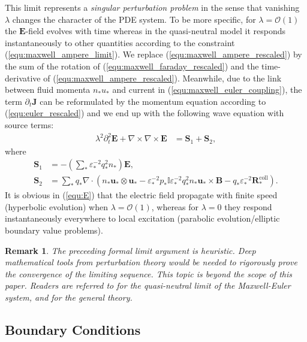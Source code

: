 \documentclass{article}
\newtheorem*{remark}{Remark}
\begin{document}
This limit represents a \emph{singular perturbation problem} in the sense that vanishing $\lambda$ changes the character of the PDE system. To be more specific, for $\lambda = \mathcal{O}(1)$ the $\mathbf{E}$-field evolves with time whereas in the quasi-neutral model it responds instantaneously to other quantities according to the constraint (\ref{equ:maxwell_ampere_limit}). We replace (\ref{equ:maxwell_ampere_rescaled}) by the sum of the rotation of (\ref{equ:maxwell_faraday_rescaled}) and the time-derivative of (\ref{equ:maxwell_ampere_rescaled}). Meanwhile, due to the link between fluid momenta $n_*u_*$ and current in (\ref{equ:maxwell_euler_coupling}), the term $\partial_t\mathbf{J}$ can be reformulated by the momentum equation according to (\ref{equ:euler_rescaled}) and we end up with the following wave equation with source terms:
\begin{align}
    \lambda^2\partial_t^2 \mathbf{E} + \nabla \times \nabla \times \mathbf{E} &= \mathbf{S}_1 + \mathbf{S}_2, \label{equ:E}
\end{align}
where
\begin{align*}
    \mathbf{S}_1 &= - \left(\sum_*\varepsilon_*^{-2}q_*^2n_*\right)\mathbf{E}, \\
    \mathbf{S}_2 &= \sum_* q_*\nabla\cdot(n_* \mathbf{u}_* \otimes \mathbf{u}_* - \varepsilon_*^{-2}p_*\mathbb{I}\varepsilon_*^{-2}q_*^2n_*\mathbf{u}_*\times\mathbf{B} - q_*\varepsilon_*^{-2}\mathbf{R}^\text{coll}_*).
\end{align*}
 It is obvious in (\ref{equ:E}) that the electric field propagate with finite speed (hyperbolic evolution) when $\lambda = \mathcal{O}(1)$, whereas for $\lambda = 0$ they respond instantaneously everywhere to local excitation (parabolic evolution/elliptic boundary value problems).

\begin{remark}
    The preceeding formal limit argument is heuristic. Deep mathematical tools from perturbation theory would be needed to rigorously prove the convergence of the limiting sequence. This topic is beyond the scope of this paper. Readers are referred to \cite[Ch. 2]{remi_2014} \cite{Peng_2008} for the quasi-neutral limit of the Maxwell-Euler system, and \cite{mark_1995, Eckhaus_1980} for the general theory.
\end{remark} 

\subsection{Boundary Conditions} \label{sec:BC}
\end{document}
